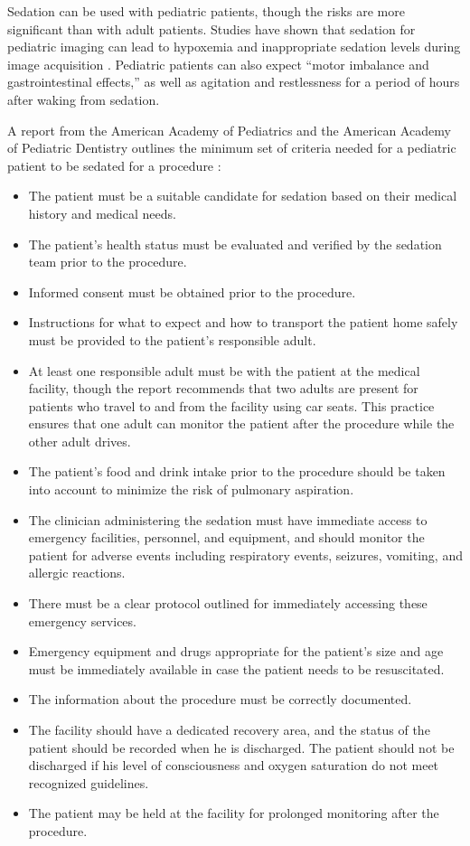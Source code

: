 Sedation can be used with pediatric patients, though the risks are more significant than with adult patients. Studies have shown that sedation for pediatric imaging can lead to hypoxemia and inappropriate sedation levels during image acquisition \cite{Malviya2000}. Pediatric patients can also expect ``motor imbalance and gastrointestinal effects,'' as well as agitation and restlessness for a period of hours after waking from sedation.

A report from the American Academy of Pediatrics and the American Academy of Pediatric Dentistry outlines the minimum set of criteria needed for a pediatric patient to be sedated for a procedure \cite{Cote2016}:
\begin{itemize}
\item The patient must be a suitable candidate for sedation based on their medical history and medical needs.
\item The patient's health status must be evaluated and verified by the sedation team prior to the procedure.
\item Informed consent must be obtained prior to the procedure.
\item Instructions for what to expect and how to transport the patient home safely must be provided to the patient's responsible adult.
\item At least one responsible adult must be with the patient at the medical facility, though the report recommends that two adults are present for patients who travel to and from the facility using car seats. This practice ensures that one adult can monitor the patient after the procedure while the other adult drives.
\item The patient's food and drink intake prior to the procedure should be taken into account to minimize the risk of pulmonary aspiration.
\item The clinician administering the sedation must have immediate access to emergency facilities, personnel, and equipment, and should monitor the patient for adverse events including respiratory events, seizures, vomiting, and allergic reactions.
\item There must be a clear protocol outlined for immediately accessing these emergency services.
\item Emergency equipment and drugs appropriate for the patient's size and age must be immediately available in case the patient needs to be resuscitated.
\item The information about the procedure must be correctly documented.
\item The facility should have a dedicated recovery area, and the status of the patient should be recorded when he is discharged. The patient should not be discharged if his level of consciousness and oxygen saturation do not meet recognized guidelines.
\item The patient may be held at the facility for prolonged monitoring after the procedure.
\end{itemize}
